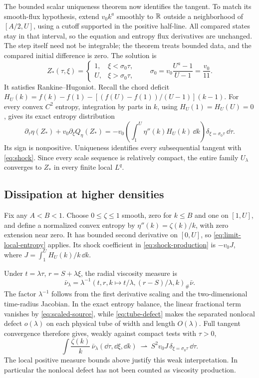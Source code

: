 The bounded scalar uniqueness theorem
\cite[Section~6.1, Theorem~4]{Bressan2009} now identifies the tangent.
To match its smooth-flux hypothesis, extend $v_0k^a$ smoothly to $\mathbb R$
outside a neighborhood of $[A/2,U]$, using a cutoff supported in the
positive half-line. All compared states stay in that interval, so the
equation and entropy flux derivatives are unchanged. The step itself
need not be integrable; the theorem treats bounded data, and the compared
initial difference is zero. The solution is
\begin{equation}\label{eq:shock}
 Z_*(\tau,\xi)=\begin{cases}1,&\xi<\sigma_0\tau,\\
 U,&\xi>\sigma_0\tau,\end{cases}
 \qquad \sigma_0=v_0\frac{U^a-1}{U-1}=\frac{v_0}{11}.
\end{equation}
It satisfies Rankine--Hugoniot. Recall the chord deficit
$H_U(k)=f(k)-f(1)-[(f(U)-f(1))/(U-1)](k-1)$.
For every convex $C^2$ entropy, integration by parts in $k$, using
$H_U(1)=H_U(U)=0$, gives its exact
entropy distribution
\begin{equation}\label{eq:shock-production}
 \partial_\tau\eta(Z_*)+v_0\partial_\xi Q_\eta(Z_*)
 =-v_0\left(\int_1^U\eta''(k)H_U(k)\,\dd k\right)
             \delta_{\xi=\sigma_0\tau}\,\dd\tau.
\end{equation}
Its sign is nonpositive. Uniqueness identifies every subsequential tangent
with \eqref{eq:shock}. Since every scale sequence is relatively compact,
the entire family $U_\lambda$ converges to $Z_*$ in every finite local
$L^q$.

\subsection{Dissipation at higher densities}

Fix any $A<B<1$. Choose $0\leq\zeta\leq1$ smooth, zero for $k\leq B$
and one on $[1,U]$, and define a normalized convex entropy by
$\eta''(k)=\zeta(k)/k$, with zero extension near zero. It has bounded
second derivative on $[0,U]$, so \eqref{eq:limit-local-entropy} applies.
Its shock coefficient in \eqref{eq:shock-production} is $-v_0J$, where
$J=\int_1^U H_U(k)/k\,\dd k$.

Under $t=\lambda\tau$, $r=S+\lambda\xi$, the radial viscosity measure is
\[
 \bar\nu_\lambda=\lambda^{-1}
 (t,r,k\mapsto t/\lambda,(r-S)/\lambda,k)_\#\bar\nu.
\]
The factor $\lambda^{-1}$ follows from the first derivative scaling
and the two-dimensional time-radius Jacobian. In the exact entropy
balance, the linear fractional term vanishes by
\eqref{eq:scaled-source}, while \eqref{eq:tube-defect} makes the separated
nonlocal defect $o(\lambda)$ on each physical tube of width and length
$O(\lambda)$. Full tangent convergence therefore gives, weakly against
compact tests with $\tau>0$,
\begin{equation}\label{eq:viscosity-shock}
 \int\frac{\zeta(k)}k\,\bar\nu_\lambda(\dd\tau,\dd\xi,\dd k)
 \ \rightharpoonup\ S^2v_0J\,
              \delta_{\xi=\sigma_0\tau}\,\dd\tau.
\end{equation}
The local positive measure bounds above justify this weak interpretation.
In particular the nonlocal defect has not been counted as viscosity
production.

